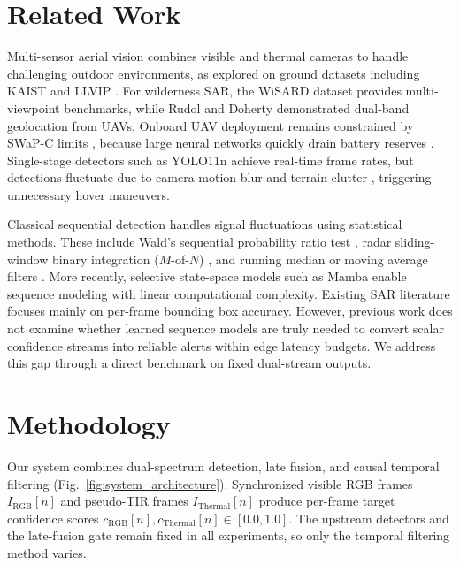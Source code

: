 \documentclass[conference]{IEEEtran}
\begin{document}
\section{Related Work}

Multi-sensor aerial vision combines visible and thermal cameras to handle challenging outdoor environments, as explored on ground datasets including KAIST \cite{hwang2015multispectral} and LLVIP \cite{jia2021llvip}. For wilderness SAR, the WiSARD dataset \cite{broyles2022wisard} provides multi-viewpoint benchmarks, while Rudol and Doherty \cite{rudol2008human} demonstrated dual-band geolocation from UAVs. Onboard UAV deployment remains constrained by SWaP-C limits \cite{silvagni2016multipurpose}, because large neural networks quickly drain battery reserves \cite{lygouras2019unsupervised}. Single-stage detectors such as YOLO11n \cite{jocher2024yolo11} achieve real-time frame rates, but detections fluctuate due to camera motion blur and terrain clutter \cite{portmann2014people}, triggering unnecessary hover maneuvers.
 
Classical sequential detection handles signal fluctuations using statistical methods. These include Wald's sequential probability ratio test \cite{wald1945sequential}, radar sliding-window binary integration ($M$-of-$N$) \cite{richards2014fundamentals}, and running median or moving average filters \cite{rabiner1975applications}. More recently, selective state-space models such as Mamba \cite{gu2024mamba} enable sequence modeling with linear computational complexity. Existing SAR literature focuses mainly on per-frame bounding box accuracy. However, previous work does not examine whether learned sequence models are truly needed to convert scalar confidence streams into reliable alerts within edge latency budgets. We address this gap through a direct benchmark on fixed dual-stream outputs.

\section{Methodology}

Our system combines dual-spectrum detection, late fusion, and causal temporal filtering (Fig.~\ref{fig:system_architecture}). Synchronized visible RGB frames $I_{\text{RGB}}[n]$ and pseudo-TIR frames $I_{\text{Thermal}}[n]$ produce per-frame target confidence scores $c_{\text{RGB}}[n], c_{\text{Thermal}}[n] \in [0.0, 1.0]$. The upstream detectors and the late-fusion gate remain fixed in all experiments, so only the temporal filtering method varies.
\end{document}
